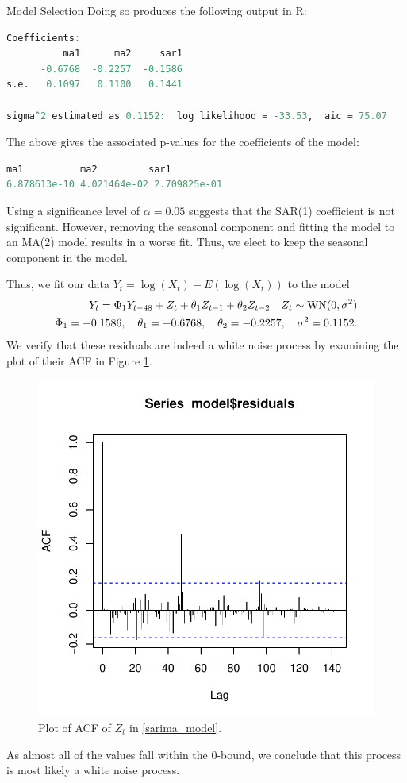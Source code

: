 \begin{subsection}{Model Selection}
  Doing so produces the following output in R:
  \begin{lstlisting}[language=R]
Coefficients:
          ma1      ma2     sar1
      -0.6768  -0.2257  -0.1586
s.e.   0.1097   0.1100   0.1441

sigma^2 estimated as 0.1152:  log likelihood = -33.53,  aic = 75.07
  \end{lstlisting}
  The above gives the associated p-values for the coefficients of the model:
  \begin{lstlisting}[language=R]
      ma1          ma2         sar1
6.878613e-10 4.021464e-02 2.709825e-01
  \end{lstlisting}

  Using a significance level of $\alpha=0.05$ suggests that the SAR(1) coefficient
  is not significant. However, removing the seasonal component and fitting the model
  to an MA(2) model results in a worse fit. Thus, we elect to keep the seasonal
  component in the model.

  Thus, we fit our data $Y_t = \log(X_t) - E(\log(X_t))$ to the model
  \begin{align}\label{sarima_model}
    Y_t = \Phi_1Y_{t-48} + Z_t + \theta_1Z_{t-1} + \theta_2Z_{t-2} \quad Z_t \sim \text{WN}(0, \sigma^2) \notag\\
    \Phi_1 = -0.1586, \quad \theta_1 = -0.6768, \quad \theta_2 = -0.2257, \quad \sigma^2 = 0.1152.
  \end{align}
  We verify that these residuals are indeed
  a white noise process by examining the plot of their ACF in Figure \ref{res_acf}.

  \begin{figure}[!h]
    \centerline{\includegraphics[scale=0.75]{../analysis/plots/res_acf}}
    \caption{Plot of ACF of $Z_t$ in \eqref{sarima_model}.}\label{res_acf}
  \end{figure}

  As almost all of the values fall within the 0-bound, we conclude that this
  process is most likely a white noise process.

\end{subsection}